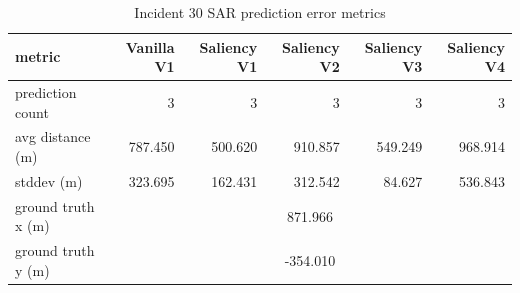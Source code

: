 \begin{table}[ht]
\centering
\caption{Incident 30 SAR prediction error metrics}
\label{tab:sar-incident-30}
\begin{tabular}{lrrrrr}
\hline
metric & Vanilla V1 & Saliency V1 & Saliency V2 & Saliency V3 & Saliency V4 \\
\hline
prediction count & 3 & 3 & 3 & 3 & 3 \\
avg distance (m) & 787.450 & 500.620 & 910.857 & 549.249 & 968.914 \\
stddev (m) & 323.695 & 162.431 & 312.542 & 84.627 & 536.843 \\
ground truth x (m) & \multicolumn{5}{c}{871.966} \\
ground truth y (m) & \multicolumn{5}{c}{-354.010} \\
\hline
\end{tabular}
\end{table}
